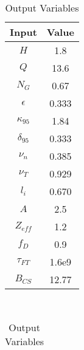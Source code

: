 \begin{table}[b!]
\centering
\caption{ARC Variables}
\hfill
\begin{subtable}[t]{0.4\textwidth}
\centering
\caption{Input Variables} ~\\
\begin{tabular}{ c|c }

Input            & Value           \\
\hline
$H$              & 1.8             \\
$Q$              & 13.6            \\
$N_{G}$          & 0.67            \\
$\epsilon$       & 0.333          \\
$\kappa_{95}$    & 1.84            \\
$\delta_{95}$    & 0.333           \\
$\nu_{n}$        & 0.385           \\
$\nu_{T}$        & 0.929           \\
$l_{i}$          & 0.670            \\
$A$              & 2.5             \\
$Z_{eff}$        & 1.2             \\
$f_{D}$          & 0.9             \\
$\tau_{FT}$      & 1.6e9           \\
$B_{CS}$         & 12.77           \\

\end{tabular}
\end{subtable}
\hfill
\begin{subtable}[t]{0.5\textwidth}
\centering
\caption{Output Variables} ~\\
\begin{tabular}{ c|c|c }


\end{tabular}
\end{subtable}
\end{table}
